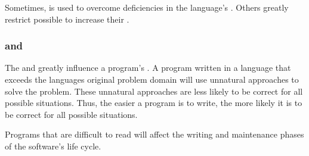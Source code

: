 Sometimes,  is used to overcome deficiencies in the language's .
Others greatly restrict possible  to increase their .

\subsubsection{ and }\label{subsubsec:Reliable_Readability_and_Writability}
The  and  greatly influence a program's .
A program written in a language that exceeds the languages original problem domain will use unnatural approaches to solve the problem.
These unnatural approaches are less likely to be correct for all possible situations.
Thus, the easier a program is to write, the more likely it is to be correct for all possible situations.

Programs that are difficult to read will affect the writing and maintenance phases of the software's life cycle.

